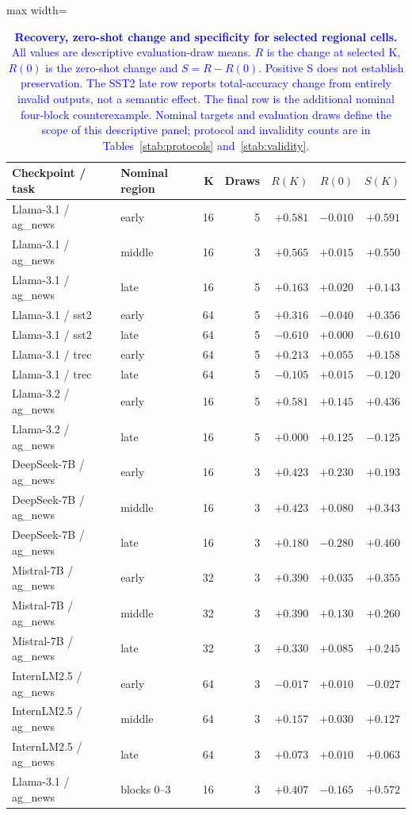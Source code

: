 \begin{table}[t]
\centering\color{blue}
\caption{\textcolor{blue}{\textbf{Recovery, zero-shot change and specificity for selected regional cells.}
All values are descriptive evaluation-draw means. $R$ is the change at selected K,
$R(0)$ is the zero-shot change and $S=R-R(0)$. Positive S does not establish preservation.
The SST2 late row reports total-accuracy change from entirely invalid outputs, not a
semantic effect. The final row is the additional nominal four-block counterexample.
Nominal targets and evaluation draws define the scope of this descriptive panel; protocol
and invalidity counts are in Tables~\ref{stab:protocols} and~\ref{stab:validity}.}}
\label{stab:components}
\footnotesize
\begin{adjustbox}{max width=\textwidth}
\begin{tabular}{llrrrrr}
\toprule
Checkpoint / task & Nominal region & K & Draws & $R(K)$ & $R(0)$ & $S(K)$ \\
\midrule
Llama-3.1 / ag\_news & early & 16 & 5 & $+0.581$ & $-0.010$ & $+0.591$ \\
Llama-3.1 / ag\_news & middle & 16 & 3 & $+0.565$ & $+0.015$ & $+0.550$ \\
Llama-3.1 / ag\_news & late & 16 & 5 & $+0.163$ & $+0.020$ & $+0.143$ \\
Llama-3.1 / sst2 & early & 64 & 5 & $+0.316$ & $-0.040$ & $+0.356$ \\
Llama-3.1 / sst2 & late & 64 & 5 & $-0.610$ & $+0.000$ & $-0.610$ \\
Llama-3.1 / trec & early & 64 & 5 & $+0.213$ & $+0.055$ & $+0.158$ \\
Llama-3.1 / trec & late & 64 & 5 & $-0.105$ & $+0.015$ & $-0.120$ \\
Llama-3.2 / ag\_news & early & 16 & 5 & $+0.581$ & $+0.145$ & $+0.436$ \\
Llama-3.2 / ag\_news & late & 16 & 5 & $+0.000$ & $+0.125$ & $-0.125$ \\
DeepSeek-7B / ag\_news & early & 16 & 3 & $+0.423$ & $+0.230$ & $+0.193$ \\
DeepSeek-7B / ag\_news & middle & 16 & 3 & $+0.423$ & $+0.080$ & $+0.343$ \\
DeepSeek-7B / ag\_news & late & 16 & 3 & $+0.180$ & $-0.280$ & $+0.460$ \\
Mistral-7B / ag\_news & early & 32 & 3 & $+0.390$ & $+0.035$ & $+0.355$ \\
Mistral-7B / ag\_news & middle & 32 & 3 & $+0.390$ & $+0.130$ & $+0.260$ \\
Mistral-7B / ag\_news & late & 32 & 3 & $+0.330$ & $+0.085$ & $+0.245$ \\
InternLM2.5 / ag\_news & early & 64 & 3 & $-0.017$ & $+0.010$ & $-0.027$ \\
InternLM2.5 / ag\_news & middle & 64 & 3 & $+0.157$ & $+0.030$ & $+0.127$ \\
InternLM2.5 / ag\_news & late & 64 & 3 & $+0.073$ & $+0.010$ & $+0.063$ \\
Llama-3.1 / ag\_news & blocks 0--3 & 16 & 3 & $+0.407$ & $-0.165$ & $+0.572$ \\
\bottomrule\end{tabular}\end{adjustbox}\end{table}
